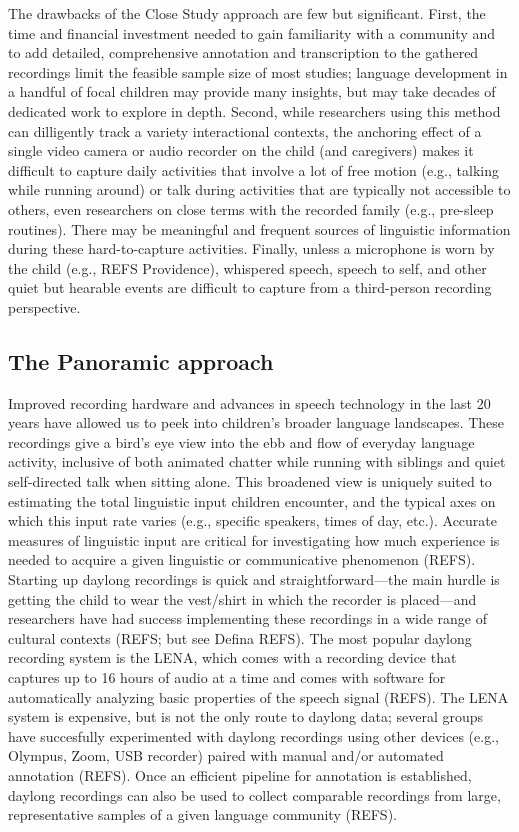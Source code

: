 \documentclass[,man,floatsintext]{apa6}
\begin{document}
The drawbacks of the Close Study approach are few but significant.
First, the time and financial investment needed to gain familiarity with
a community and to add detailed, comprehensive annotation and
transcription to the gathered recordings limit the feasible sample size
of most studies; language development in a handful of focal children may
provide many insights, but may take decades of dedicated work to explore
in depth. Second, while researchers using this method can dilligently
track a variety interactional contexts, the anchoring effect of a single
video camera or audio recorder on the child (and caregivers) makes it
difficult to capture daily activities that involve a lot of free motion
(e.g., talking while running around) or talk during activities that are
typically not accessible to others, even researchers on close terms with
the recorded family (e.g., pre-sleep routines). There may be meaningful
and frequent sources of linguistic information during these
hard-to-capture activities. Finally, unless a microphone is worn by the
child (e.g., REFS Providence), whispered speech, speech to self, and
other quiet but hearable events are difficult to capture from a
third-person recording perspective.

\subsection{The Panoramic approach}\label{the-panoramic-approach}

Improved recording hardware and advances in speech technology in the
last 20 years have allowed us to peek into children's broader language
landscapes. These recordings give a bird's eye view into the ebb and
flow of everyday language activity, inclusive of both animated chatter
while running with siblings and quiet self-directed talk when sitting
alone. This broadened view is uniquely suited to estimating the total
linguistic input children encounter, and the typical axes on which this
input rate varies (e.g., specific speakers, times of day, etc.).
Accurate measures of linguistic input are critical for investigating how
much experience is needed to acquire a given linguistic or communicative
phenomenon (REFS). Starting up daylong recordings is quick and
straightforward---the main hurdle is getting the child to wear the
vest/shirt in which the recorder is placed---and researchers have had
success implementing these recordings in a wide range of cultural
contexts (REFS; but see Defina REFS). The most popular daylong recording
system is the LENA, which comes with a recording device that captures up
to 16 hours of audio at a time and comes with software for automatically
analyzing basic properties of the speech signal (REFS). The LENA system
is expensive, but is not the only route to daylong data; several groups
have succesfully experimented with daylong recordings using other
devices (e.g., Olympus, Zoom, USB recorder) paired with manual and/or
automated annotation (REFS). Once an efficient pipeline for annotation
is established, daylong recordings can also be used to collect
comparable recordings from large, representative samples of a given
language community (REFS).
\end{document}

